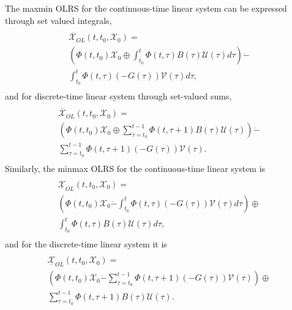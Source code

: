 \documentclass[letterpaper,10pt,english]{sphinxmanual}
\begin{document}
The maxmin OLRS for the continuous-time linear system can be expressed
through set valued integrals,
\label{main_source:equation-ctlsmaxmin}\begin{gather}
\begin{split}\begin{array}{l}
\overline{{\mathcal X}}_{OL}(t, t_0, {\mathcal X}_0) = \\
\left(\Phi(t, t_0){\mathcal X}_0 \oplus
\int_{t_0}^t\Phi(t, \tau)B(\tau){\mathcal U}(\tau)d\tau\right) \dot{-} \\
\int_{t_0}^t\Phi(t, \tau)(-G(\tau)){\mathcal V}(\tau)d\tau,
\end{array}\end{split}\label{main_source-ctlsmaxmin}
\end{gather}
and for discrete-time linear system through set-valued sums,
\label{main_source:equation-dtlsmaxmin}\begin{gather}
\begin{split}\begin{array}{l}
\overline{{\mathcal X}}_{OL}(t, t_0, {\mathcal X}_0) = \\
\left(\Phi(t, t_0){\mathcal X}_0 \oplus \sum_{\tau=t_0}^{t-1}\Phi(t, \tau+1)B(\tau){\mathcal U}(\tau)\right) \dot{-} \\
\sum_{\tau=t_0}^{t-1}\Phi(t, \tau+1)(-G(\tau)){\mathcal V}(\tau).
\end{array}\end{split}\label{main_source-dtlsmaxmin}
\end{gather}
Similarly, the minmax OLRS for the continuous-time linear system is
\label{main_source:equation-ctlsminmax}\begin{gather}
\begin{split}\begin{array}{l}
\underline{{\mathcal X}}_{OL}(t, t_0, {\mathcal X}_0) = \\
\left(\Phi(t, t_0){\mathcal X}_0 \dot{-}
\int_{t_0}^t\Phi(t, \tau)(-G(\tau)){\mathcal V}(\tau)d\tau\right)
\oplus \\
\int_{t_0}^t\Phi(t, \tau)B(\tau){\mathcal U}(\tau)d\tau,
\end{array}\end{split}\label{main_source-ctlsminmax}
\end{gather}
and for the discrete-time linear system it is
\label{main_source:equation-dtlsminmax}\begin{gather}
\begin{split}\begin{array}{l}
\underline{{\mathcal X}}_{OL}(t, t_0, {\mathcal X}_0) = \\
\left(\Phi(t, t_0){\mathcal X}_0 \dot{-} \sum_{\tau=t_0}^{t-1}\Phi(t, \tau+1)(-G(\tau)){\mathcal V}(\tau)\right) \oplus \\
\sum_{\tau=t_0}^{t-1}\Phi(t, \tau+1)B(\tau){\mathcal U}(\tau).
\end{array}\end{split}\label{main_source-dtlsminmax}
\end{gather}
\end{document}
